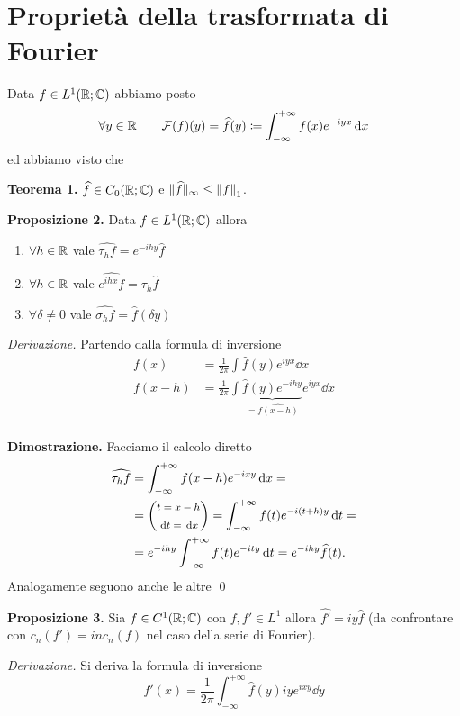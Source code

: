 
\section{Proprietà della trasformata di Fourier}

Data $f \in L^1(\mathbb R; \mathbb C)$ abbiamo posto
$$
\forall y \in \mathbb R
\qquad 
\mathcal F(f)(y) = \widehat f(y) \coloneqq \int_{-\infty}^{+\infty} f(x) e^{-iyx} \,\mathrm{d} x
$$
ed abbiamo visto che

\textbf{Teorema 1.}
$\widehat f \in C_0(\mathbb R; \mathbb C)$ e $\| \widehat f \|_\infty \leq \left\lVert f \right\rVert_1$.

\textbf{Proposizione 2.}
Data $f \in L^1(\mathbb R; \mathbb C)$ allora
\begin{enumerate}
	\item $\forall h \in \mathbb R$ vale $\hat{\tau_h f} = e^{-ihy} \hat f$
	\item $\forall h \in \mathbb R$ vale $\hat{e^{ihx} f} =  \tau_h \hat f$
	\item $\forall \delta \neq 0$ vale $\hat{\sigma_h f} = \hat f(\delta y)$
\end{enumerate}

\textit{Derivazione.}
Partendo dalla formula di inversione
$$
\begin{aligned}
	f(x) &= \frac{1}{2\pi} \int \hat f(y) e^{iyx} \dd x \\
	f(x - h) &= \frac{1}{2\pi} \int \underbrace{\hat f(y) e^{-ihy}}_{=\hat{f(x-h)}} e^{iyx} \dd x \\
\end{aligned}
$$

\textbf{Dimostrazione.}
Facciamo il calcolo diretto
$$
\begin{aligned}
	\widehat{\tau_h f}
	&= \int_{-\infty}^{+\infty} f(x - h) e^{-ixy} \,\mathrm{d} x =\\
	&= {\footnotesize \left(\begin{gathered} t = x - h \\ \,\mathrm{d} t = \,\mathrm{d} x \end{gathered}\right)} 
	= \int_{-\infty}^{+\infty} f(t) e^{-i(t + h)y} \,\mathrm{d} t = \\
	&= e^{-ihy} \int_{-\infty}^{+\infty} f(t) e^{-ity} \,\mathrm{d} t = e^{-ihy} \widehat f(t).
\end{aligned}
$$
Analogamente seguono anche le altre
\qed

\textbf{Proposizione 3.}
Sia $f \in C^1(\mathbb R; \mathbb C)$ con $f, f' \in L^1$ allora $\hat{f'} = iy\hat f$ (da confrontare con $c_n(f') = in c_n(f)$ nel caso della serie di Fourier).

\textit{Derivazione.} Si deriva la formula di inversione
$$
f'(x) = \frac{1}{2\pi} \int_{-\infty}^{+\infty} \hat f(y) i y e^{ixy} \dd y
$$

